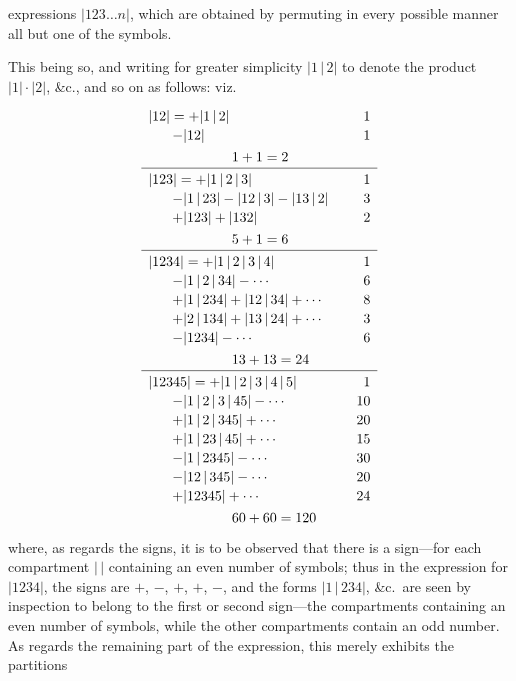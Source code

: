 \documentclass[11pt,a4paper]{article}
\begin{document}
\noindent expressions $|123\ldots n|$, which are obtained by permuting in every possible manner all but one of the symbols.

\medskip

This being so, and writing for greater simplicity $|1\,|\,2|$ to denote the product $|1|\cdot|2|$, \&c., and so on as follows: viz.
\[
\renewcommand{\arraystretch}{1.3}
\begin{array}{l@{\qquad}r}
|12|=+|1\,|\,2| & 1 \\[-0.2em]
\quad\;\;\, -|12| & 1 \\
\multicolumn{2}{l}{\qquad\qquad\qquad 1+1=2} \\
\hline
|123|=+|1\,|\,2\,|\,3| & 1 \\[-0.2em]
\quad\;\;\, -|1\,|\,23|-|12\,|\,3|-|13\,|\,2| & 3 \\[-0.2em]
\quad\;\;\, +|123|+|132| & 2 \\
\multicolumn{2}{l}{\qquad\qquad\qquad 5+1=6} \\
\hline
|1234|=+|1\,|\,2\,|\,3\,|\,4| & 1 \\[-0.2em]
\quad\;\;\, -|1\,|\,2\,|\,34|-\cdots & 6 \\[-0.2em]
\quad\;\;\, +|1\,|\,234|+|12\,|\,34|+\cdots & 8 \\[-0.2em]
\quad\;\;\, +|2\,|\,134|+|13\,|\,24|+\cdots & 3 \\[-0.2em]
\quad\;\;\, -|1234|-\cdots & 6 \\
\multicolumn{2}{l}{\qquad\qquad\qquad 13+13=24} \\
\hline
|12345|=+|1\,|\,2\,|\,3\,|\,4\,|\,5| & 1 \\[-0.2em]
\quad\;\;\, -|1\,|\,2\,|\,3\,|\,45|-\cdots & 10 \\[-0.2em]
\quad\;\;\, +|1\,|\,2\,|\,345|+\cdots & 20 \\[-0.2em]
\quad\;\;\, +|1\,|\,23\,|\,45|+\cdots & 15 \\[-0.2em]
\quad\;\;\, -|1\,|\,2345|-\cdots & 30 \\[-0.2em]
\quad\;\;\, -|12\,|\,345|-\cdots & 20 \\[-0.2em]
\quad\;\;\, +|12345|+\cdots & 24 \\
\multicolumn{2}{l}{\qquad\qquad\qquad 60+60=120}
\end{array}
\]
where, as regards the signs, it is to be observed that there is a sign---for each compartment $|\,|$ containing an even number of symbols; thus in the expression for $|1234|$, the signs are $+$, $-$, $+$, $+$, $-$, and the forms $|1\,|\,234|$, \&c.\ are seen by inspection to belong to the first or second sign---the compartments containing an even number of symbols, while the other compartments contain an odd number. As regards the remaining part of the expression, this merely exhibits the partitions
\clearpage
\end{document}
